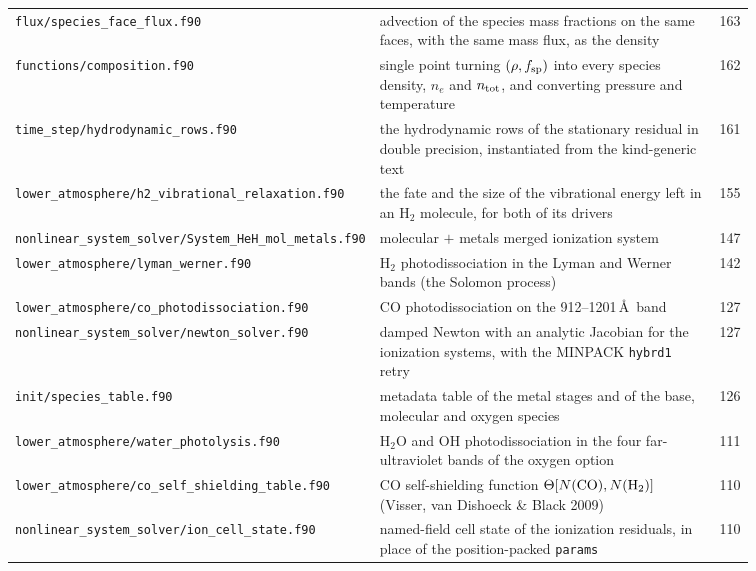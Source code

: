 {\begin{longtable}{@{}>{\raggedright\arraybackslash}p{0.36\linewidth} >{\raggedright\arraybackslash}p{0.50\linewidth} r@{}}
\texttt{flux/\allowbreak species\_\allowbreak face\_\allowbreak flux.f90} & advection of the species mass fractions on the same faces, with the same mass flux, as the density & 163 \\
\texttt{functions/\allowbreak composition.f90} & single point turning $(\rho, f_{\rm sp})$ into every species density, $n_e$ and $n_{\rm tot}$, and converting pressure and temperature & 162 \\
\texttt{time\_\allowbreak step/\allowbreak hydrodynamic\_\allowbreak rows.f90} & the hydrodynamic rows of the stationary residual in double precision, instantiated from the kind-generic text & 161 \\
\texttt{lower\_\allowbreak atmosphere/\allowbreak h2\_\allowbreak vibrational\_\allowbreak relaxation.f90} & the fate and the size of the vibrational energy left in an H$_2$ molecule, for both of its drivers & 155 \\
\texttt{nonlinear\_\allowbreak system\_\allowbreak solver/\allowbreak System\_\allowbreak HeH\_\allowbreak mol\_\allowbreak metals.f90} & molecular $+$ metals merged ionization system & 147 \\
\texttt{lower\_\allowbreak atmosphere/\allowbreak lyman\_\allowbreak werner.f90} & H$_2$ photodissociation in the Lyman and Werner bands (the Solomon process) & 142 \\
\texttt{lower\_\allowbreak atmosphere/\allowbreak co\_\allowbreak photodissociation.f90} & CO photodissociation on the 912--1201\,\AA\ band & 127 \\
\texttt{nonlinear\_\allowbreak system\_\allowbreak solver/\allowbreak newton\_\allowbreak solver.f90} & damped Newton with an analytic Jacobian for the ionization systems, with the MINPACK \texttt{hybrd1} retry & 127 \\
\texttt{init/\allowbreak species\_\allowbreak table.f90} & metadata table of the metal stages and of the base, molecular and oxygen species & 126 \\
\texttt{lower\_\allowbreak atmosphere/\allowbreak water\_\allowbreak photolysis.f90} & H$_2$O and OH photodissociation in the four far-ultraviolet bands of the oxygen option & 111 \\
\texttt{lower\_\allowbreak atmosphere/\allowbreak co\_\allowbreak self\_\allowbreak shielding\_\allowbreak table.f90} & CO self-shielding function $\Theta[N({\rm CO}), N({\rm H_2})]$ (Visser, van Dishoeck \& Black 2009) & 110 \\
\texttt{nonlinear\_\allowbreak system\_\allowbreak solver/\allowbreak ion\_\allowbreak cell\_\allowbreak state.f90} & named-field cell state of the ionization residuals, in place of the position-packed \texttt{params} & 110 \\

\end{longtable}}
